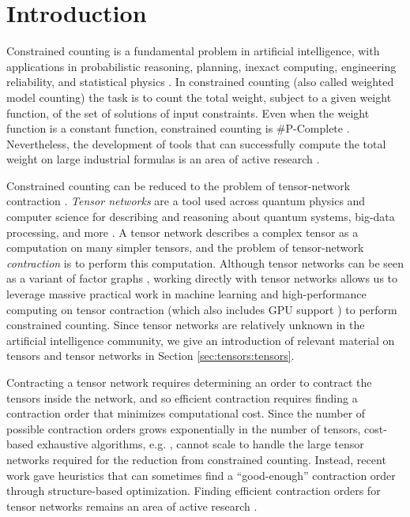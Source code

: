 \section{Introduction}
Constrained counting is a fundamental problem in artificial intelligence, with applications in probabilistic reasoning, planning, inexact computing, engineering reliability, and statistical physics \cite{Bacchus2003,DH07,GSS08}. In constrained counting (also called weighted model counting) the task is to count the total weight, subject to a given weight function, of the set of solutions of input constraints. Even when the weight function is a constant function, constrained counting is \#P-Complete \cite{Valiant79}. Nevertheless, the development of tools that can successfully compute the total weight on large industrial formulas is an area of active research \cite{OD15,Thurley2006}. 

Constrained counting can be reduced to the problem of tensor-network contraction \cite{BMT15}. \emph{Tensor networks} are a tool used across quantum physics and computer science for describing and reasoning about quantum systems, big-data processing, and more \cite{BB17,Cichocki14,Orus19}. A tensor network describes a complex tensor as a computation on many simpler tensors, and the problem of tensor-network \emph{contraction} is to perform this computation. Although tensor networks can be seen as a variant of factor graphs \cite{KFL01}, working directly with tensor networks allows us to leverage massive practical work in machine learning and high-performance computing on tensor contraction \cite{BK07,Hirata03,KKCLA17,VZTGDMVAC18} (which also includes GPU support \cite{KSTKPPRS19,NRBHHJN15}) to perform constrained counting. Since tensor networks are relatively unknown in the artificial intelligence community, we give an introduction of relevant material on tensors and tensor networks in Section \ref{sec:tensors:tensors}.

Contracting a tensor network requires determining an order to contract the tensors inside the network, and so efficient contraction requires finding a contraction order that minimizes computational cost. Since the number of possible contraction orders grows exponentially in the number of tensors, cost-based exhaustive algorithms, e.g. \cite{PHV14}, cannot scale to handle the large tensor networks required for the reduction from constrained counting. Instead, recent work \cite{KCMR18} gave heuristics that can sometimes find a ``good-enough'' contraction order through structure-based optimization. Finding efficient contraction orders for tensor networks remains an area of active research \cite{RTPCTSL19}.


